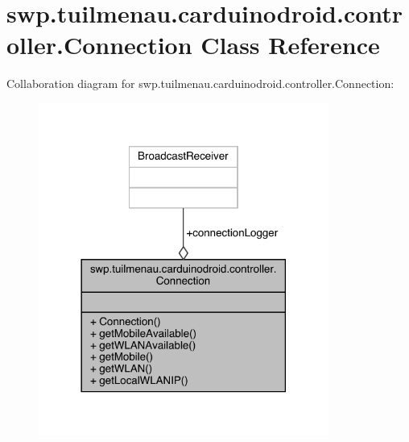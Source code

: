\hypertarget{classswp_1_1tuilmenau_1_1carduinodroid_1_1controller_1_1_connection}{}\section{swp.\+tuilmenau.\+carduinodroid.\+controller.\+Connection Class Reference}
\label{classswp_1_1tuilmenau_1_1carduinodroid_1_1controller_1_1_connection}


Collaboration diagram for swp.\+tuilmenau.\+carduinodroid.\+controller.\+Connection\+:
\nopagebreak
\begin{figure}[H]
\begin{center}
\leavevmode
\includegraphics[width=270pt]{classswp_1_1tuilmenau_1_1carduinodroid_1_1controller_1_1_connection__coll__graph}
\end{center}
\end{figure}
